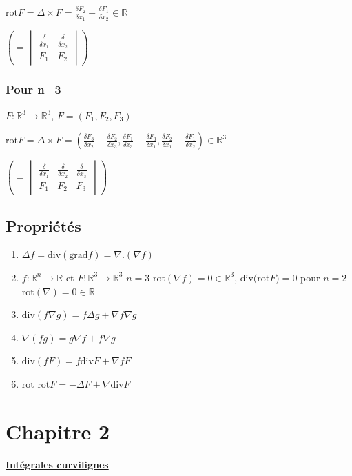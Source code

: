 \documentclass[11pt]{article}
\begin{document}
\(\text{rot} F = \Delta \times F = \frac{\delta F_2}{\delta x_1} - \frac{\delta
F_1}{\delta x_2} \in \mathbb{R}\)

\(\left(= \begin{vmatrix}
\frac{\delta}{\delta x_1} & \frac{\delta}{\delta x_2}\\
F_1 & F_2
\end{vmatrix}\right)\)
\subsubsection{Pour n=3}
\label{sec:orgheadline6}
\(F: \mathbb{R}^3 \rightarrow \mathbb{R}^3\), \(F=(F_1,F_2,F_3)\)

\(\text{rot} F = \Delta \times F = \left( \frac{\delta F_3}{\delta x_2} -
\frac{\delta F_2}{\delta x_3},\frac{\delta F_1}{\delta x_3} - \frac{\delta
F_3}{\delta x_1}, \frac{\delta F_2}{\delta x_1} - \frac{\delta F_1}{\delta x_2}
\right) \in \mathbb{R}^3\)

\(\left(= \begin{vmatrix}
\frac{\delta}{\delta x_1} & \frac{\delta}{\delta x_2}& \frac{\delta}{\delta x_3}\\
F_1 & F_2 & F_3
\end{vmatrix}\right)\)
\subsection{Propriétés}
\label{sec:orgheadline8}
\begin{enumerate}
\item \(\Delta f = \text{div}(\text{grad} f) = \nabla . (\nabla f)\)
\item \(f : \mathbb{R}^n \rightarrow \mathbb{R}\) et \(F: \mathbb{R}^3 \rightarrow
   \mathbb{R}^3\) \textbf{\(n=3\)} \(\text{rot}(\nabla f) =0 \in \mathbb{R}^3\), \(\text{div(rot} F) =
   0\) pour \textbf{\(n=2\)} \(\text{rot}(\nabla) = 0 \in \mathbb{R}\)
\item \(\text{div}(f\nabla g) = f \Delta g + \nabla f \nabla g\)
\item \(\nabla(fg) = g \nabla f + f \nabla g\)
\item \(\text{div}(fF) = f \text{div} F + \nabla f F\)
\item \(\text{rot rot} F = - \Delta F + \nabla \text{div} F\)
\end{enumerate}
\section{Chapitre 2}
\label{sec:orgheadline27}
\uline{\textbf{Intégrales curvilignes}}
\end{document}
